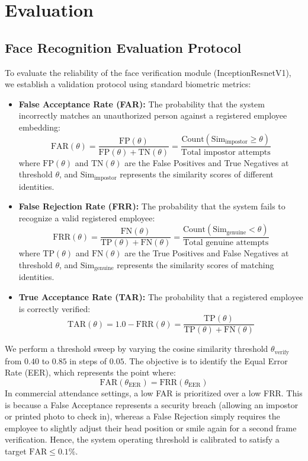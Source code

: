 \chapter{Evaluation}

\section{Face Recognition Evaluation Protocol}
To evaluate the reliability of the face verification module (InceptionResnetV1), we establish a validation protocol using standard biometric metrics:
\begin{itemize}
    \item \textbf{False Acceptance Rate (FAR):} The probability that the system incorrectly matches an unauthorized person against a registered employee embedding:
    \begin{equation}
        \text{FAR}(\theta) = \frac{\text{FP}(\theta)}{\text{FP}(\theta) + \text{TN}(\theta)} = \frac{\text{Count}(\text{Sim}_{\text{impostor}} \ge \theta)}{\text{Total impostor attempts}}
    \end{equation}
    where $\text{FP}(\theta)$ and $\text{TN}(\theta)$ are the False Positives and True Negatives at threshold $\theta$, and $\text{Sim}_{\text{impostor}}$ represents the similarity scores of different identities.
    \item \textbf{False Rejection Rate (FRR):} The probability that the system fails to recognize a valid registered employee:
    \begin{equation}
        \text{FRR}(\theta) = \frac{\text{FN}(\theta)}{\text{TP}(\theta) + \text{FN}(\theta)} = \frac{\text{Count}(\text{Sim}_{\text{genuine}} < \theta)}{\text{Total genuine attempts}}
    \end{equation}
    where $\text{TP}(\theta)$ and $\text{FN}(\theta)$ are the True Positives and False Negatives at threshold $\theta$, and $\text{Sim}_{\text{genuine}}$ represents the similarity scores of matching identities.
    \item \textbf{True Acceptance Rate (TAR):} The probability that a registered employee is correctly verified:
    \begin{equation}
        \text{TAR}(\theta) = 1.0 - \text{FRR}(\theta) = \frac{\text{TP}(\theta)}{\text{TP}(\theta) + \text{FN}(\theta)}
    \end{equation}
\end{itemize}
We perform a threshold sweep by varying the cosine similarity threshold $\theta_{\text{verify}}$ from $0.40$ to $0.85$ in steps of $0.05$. The objective is to identify the Equal Error Rate (EER), which represents the point where:
\begin{equation}
    \text{FAR}(\theta_{\text{EER}}) = \text{FRR}(\theta_{\text{EER}})
\end{equation}
In commercial attendance settings, a low FAR is prioritized over a low FRR. This is because a False Acceptance represents a security breach (allowing an impostor or printed photo to check in), whereas a False Rejection simply requires the employee to slightly adjust their head position or smile again for a second frame verification. Hence, the system operating threshold is calibrated to satisfy a target $\text{FAR} \le 0.1\%$.

